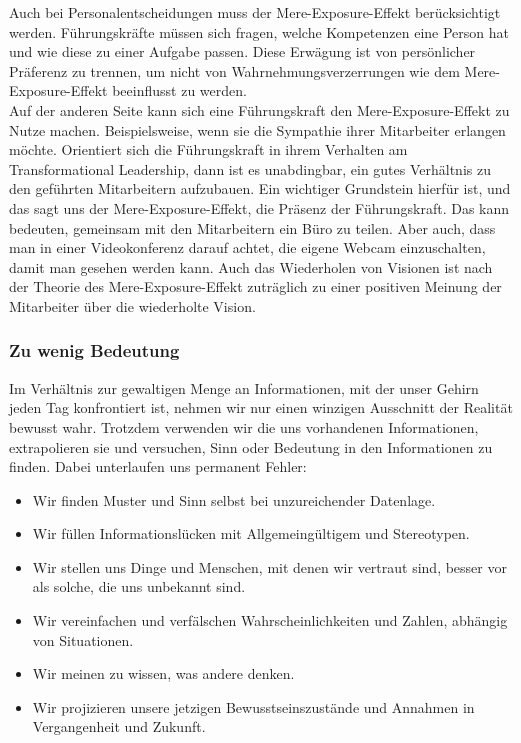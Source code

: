 Auch bei Personalentscheidungen muss der Mere-Exposure-Effekt berücksichtigt werden. Führungskräfte müssen sich fragen, welche Kompetenzen eine Person hat und wie diese zu einer Aufgabe passen. Diese Erwägung ist von persönlicher Präferenz zu trennen, um nicht von Wahrnehmungsverzerrungen wie dem Mere-Exposure-Effekt beeinflusst zu werden. \\

Auf der anderen Seite kann sich eine Führungskraft den Mere-Exposure-Effekt zu Nutze machen. Beispielsweise, wenn sie die Sympathie ihrer Mitarbeiter erlangen möchte. Orientiert sich die Führungskraft in ihrem Verhalten am Transformational Leadership, dann ist es unabdingbar, ein gutes Verhältnis zu den geführten Mitarbeitern aufzubauen. Ein wichtiger Grundstein hierfür ist, und das sagt uns der Mere-Exposure-Effekt, die Präsenz der Führungskraft. Das kann bedeuten, gemeinsam mit den Mitarbeitern ein Büro zu teilen. Aber auch, dass man in einer Videokonferenz darauf achtet, die eigene Webcam einzuschalten, damit man gesehen werden kann. Auch das Wiederholen von Visionen ist nach der Theorie des Mere-Exposure-Effekt zuträglich zu einer positiven Meinung der Mitarbeiter über die wiederholte Vision. 

\subsubsection{Zu wenig Bedeutung}
Im Verhältnis zur gewaltigen Menge an Informationen, mit der unser Gehirn jeden Tag konfrontiert ist, nehmen wir nur einen winzigen Ausschnitt der Realität bewusst wahr. Trotzdem verwenden wir die uns vorhandenen Informationen, extrapolieren sie und versuchen, Sinn oder Bedeutung in den Informationen zu finden. Dabei unterlaufen uns permanent Fehler:
\begin{itemize}
	 \item Wir finden Muster und Sinn selbst bei unzureichender Datenlage. \cite{MUL90}
	 \item Wir füllen Informationslücken mit Allgemeingültigem und Stereotypen. \cite{MIL63}
	 \item Wir stellen uns Dinge und Menschen, mit denen wir vertraut sind, besser vor als solche, die uns unbekannt sind. \cite{TAY81}
	 \item Wir vereinfachen und verfälschen Wahrscheinlichkeiten und Zahlen, abhängig von Situationen. \cite{MEE10}
	 \item Wir meinen zu wissen, was andere denken. \cite{SAV03}
	 \item Wir projizieren unsere jetzigen Bewusstseinszustände und Annahmen in Vergangenheit und Zukunft. \cite{ROE12}
\end{itemize} 

